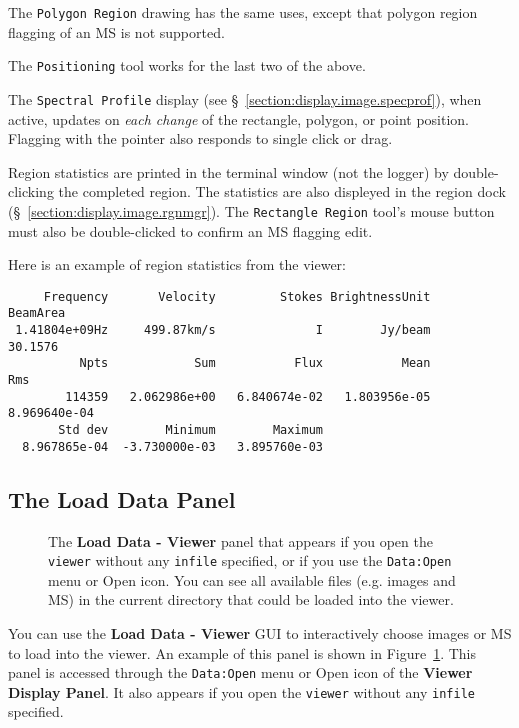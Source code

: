 The {\tt Polygon Region} drawing has the same uses, except that polygon region
flagging of an MS is not supported.

The {\tt Positioning} tool works for the last two of the above.

The {\tt Spectral Profile} display
(see \S~\ref{section:display.image.specprof}), when active, updates on
{\em each change} of the rectangle, polygon, or point position.  
Flagging with the pointer also responds to single click or drag.

Region statistics are printed in the terminal window (not the logger)
by double-clicking the completed region. The statistics are also
displeyed in the region dock
(\S~\ref{section:display.image.rgnmgr}). The {\tt Rectangle Region}
tool's mouse button must also be double-clicked to confirm an MS
flagging edit.

Here is an example of region statistics from the viewer:
\small
\begin{verbatim}
     Frequency       Velocity         Stokes BrightnessUnit       BeamArea 
 1.41804e+09Hz     499.87km/s              I        Jy/beam        30.1576 
          Npts            Sum           Flux           Mean            Rms 
        114359   2.062986e+00   6.840674e-02   1.803956e-05   8.969640e-04 
       Std dev        Minimum        Maximum 
  8.967865e-04  -3.730000e-03   3.895760e-03 
\end{verbatim}
\normalsize


\subsection{The Load Data Panel}
\label{section:display.viewerGUI.load}
\begin{figure}[h!]
\begin{center}
\caption{\label{fig:viewer_load} The {\bf Load Data - Viewer} panel
that appears if you open the {\tt viewer} without any {\tt infile}
specified, or if you use the {\tt Data:Open} menu or Open icon.
You can see all available files (e.g. images and MS) in the current directory
that could be loaded into the viewer.} 
\hrulefill
\end{center}
\end{figure}

You can use the {\bf Load Data - Viewer} GUI to interactively
choose images or MS to load into the viewer.  An example of
this panel is shown in Figure~\ref{fig:viewer_load}.  This
panel is accessed through the {\tt Data:Open} menu or Open icon
of the {\bf Viewer Display Panel}.  It also appears if you open 
the {\tt viewer} without any {\tt infile} specified.

